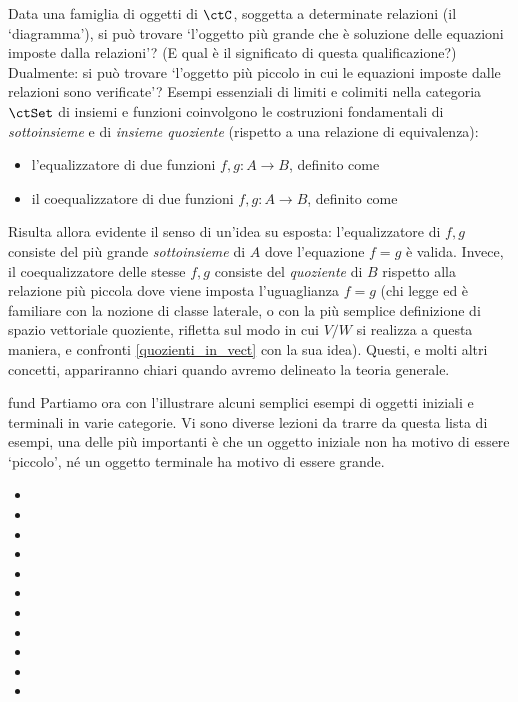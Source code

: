 Data una famiglia di oggetti di \(\ctC\), soggetta a determinate relazioni (il `diagramma'), si può trovare `l'oggetto più grande che è soluzione delle equazioni imposte dalla relazioni'? (E qual è il significato di questa qualificazione?) Dualmente: si può trovare `l'oggetto più piccolo in cui le equazioni imposte dalle relazioni sono verificate'?
\Todo{}
Esempi essenziali di limiti e colimiti nella categoria $\ctSet$ di insiemi e funzioni coinvolgono le costruzioni fondamentali di \emph{sottoinsieme} e di \emph{insieme quoziente} (rispetto a una relazione di equivalenza):
\begin{itemize}
	\item l'equalizzatore di due funzioni \(f,g : A \to B\), definito come
	      \Todo{}
	\item il coequalizzatore di due funzioni \(f,g : A \to B\), definito come
	      \Todo{}
\end{itemize}
Risulta allora evidente il senso di un'idea su esposta: l'equalizzatore di \(f,g\) consiste del più grande \emph{sottoinsieme} di \(A\) dove l'equazione \(f=g\) è valida. Invece, il coequalizzatore delle stesse \(f,g\) consiste del \emph{quoziente} di \(B\) rispetto alla relazione più piccola dove viene imposta l'uguaglianza \(f=g\) (chi legge ed è familiare con la nozione di classe laterale, o con la più semplice definizione di spazio vettoriale quoziente, rifletta sul modo in cui $V/W$ si realizza a questa maniera, e confronti \ref{quozienti_in_vect} con la sua idea).
\Todo{}
Questi, e molti altri concetti, appariranno chiari quando avremo delineato la teoria generale.
\Todo{}
\begin{hExamples}{fund}
	Partiamo ora con l'illustrare alcuni semplici esempi di oggetti iniziali e terminali in varie categorie. Vi sono diverse lezioni da trarre da questa lista di esempi, una delle più importanti è che un oggetto iniziale non ha motivo di essere `piccolo', né un oggetto terminale ha motivo di essere grande. 
	\begin{itemize}
		\item 
		\item 
		\item 
		\item 
		\item 
		\item 
		\item 
		\item 
		\item 
		\item 
		\item 
	\end{itemize}
\end{hExamples}

